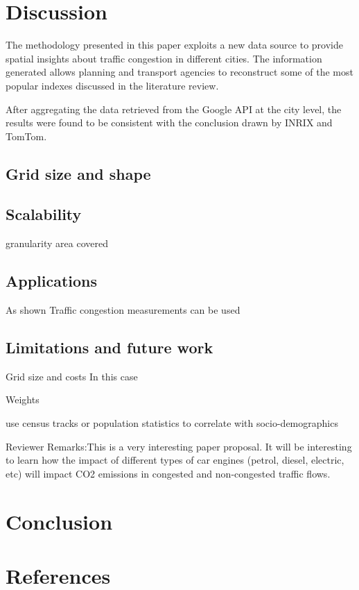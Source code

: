 \documentclass[a4paper]{jpconf}
\begin{document}
\section{Discussion}
\indent The methodology presented in this paper exploits a new data source to provide spatial insights about traffic congestion in different cities. The information generated allows planning and transport agencies to reconstruct some of the most popular indexes discussed in the literature review. \par 
\indent After aggregating the data retrieved from the Google API at the city level, the results were found to be consistent with the conclusion drawn by INRIX and TomTom.\par

\subsection{Grid size and shape}
\indent 

\subsection{Scalability}
granularity
area covered

\subsection{Applications}
\indent As shown \cite{Lomax1997} Traffic congestion measurements can be used  





\subsection{Limitations and future work}
\indent Grid size and costs
In this case 

\indent Weights

\indent use census tracks or population statistics to correlate with socio-demographics 

\indent Reviewer Remarks:This is a very interesting paper proposal. It will be interesting to learn how the impact of different types of car engines (petrol, diesel, electric, etc) will impact CO2 emissions in congested and non-congested traffic flows.


\section{Conclusion}





\section*{References}






\printbibliography
\end{document}
